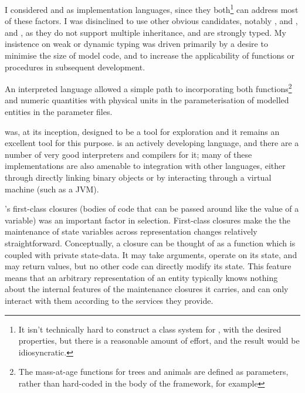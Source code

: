I considered \Cpp and \CC as implementation languages, since they
both\footnote{It isn't technically hard to construct a class system
for \CC, with the desired properties, but there is a reasonable amount
of effort, and the result would be idiosyncratic.} can address most of
these factors. I was disinclined to use other obvious candidates,
notably \Java, and \Csharp, and \DD, as they do not support multiple
inheritance, and are strongly typed. My insistence on weak or dynamic
typing was driven primarily by a desire to minimise the size of model
code, and to increase the applicability of functions or procedures in
subsequent development.

An interpreted language allowed a simple path to incorporating both
functions\footnote{The mass-at-age functions for trees and animals are
defined as parameters, rather than hard-coded in the body of the
framework, for example} and numeric quantities with physical units in the
parameterisation of modelled entities in the parameter files.

\Scheme was, at its inception, designed to be a tool for exploration
\cite{sussman1998first} and it remains an excellent tool for this
purpose. \Scheme is an actively developing language, and there are a
number of very good interpreters and compilers for it; many of these
implementations are also amenable to integration with other languages,
either through directly linking binary objects or by interacting
through a virtual machine (such as a JVM).

\Scheme's first-class closures (bodies of code that can be passed
around like the value of a variable) was an important factor in
selection.  First-class closures make the the maintenance of state
variables across representation changes relatively straightforward.
Conceptually,  a closure can be thought of as a function which is
coupled with private state-data. It may take arguments, operate on its
state, and may return values, but no other code can directly modify
its state.  This feature means that an arbitrary representation of an
entity typically knows nothing about the internal features of the
maintenance closures it carries, and can only interact with them
according to the services they provide.

